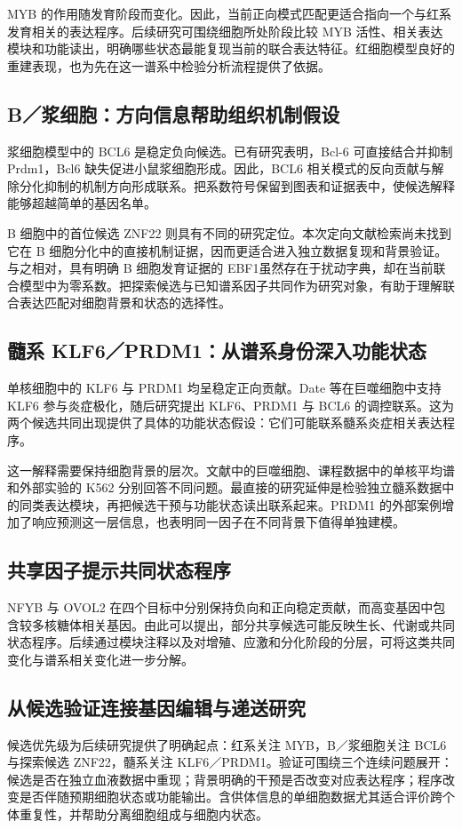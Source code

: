 \documentclass[UTF8,a4paper,11pt,fontset=fandol]{ctexart}
\begin{document}
MYB 的作用随发育阶段而变化。因此，当前正向模式匹配更适合指向一个与红系发育相关的表达程序。后续研究可围绕细胞所处阶段比较 MYB 活性、相关表达模块和功能读出，明确哪些状态最能复现当前的联合表达特征。红细胞模型良好的重建表现，也为先在这一谱系中检验分析流程提供了依据。
\subsection{B／浆细胞：方向信息帮助组织机制假设}
浆细胞模型中的 BCL6 是稳定负向候选。已有研究表明，Bcl-6 可直接结合并抑制 Prdm1，Bcl6 缺失促进小鼠浆细胞形成\cite{R05}。因此，BCL6 相关模式的反向贡献与解除分化抑制的机制方向形成联系。把系数符号保留到图表和证据表中，使候选解释能够超越简单的基因名单。

B 细胞中的首位候选 ZNF22 则具有不同的研究定位。本次定向文献检索尚未找到它在 B 细胞分化中的直接机制证据，因而更适合进入独立数据复现和背景验证。与之相对，具有明确 B 细胞发育证据的 EBF1\cite{R08}虽然存在于扰动字典，却在当前联合模型中为零系数。把探索候选与已知谱系因子共同作为研究对象，有助于理解联合表达匹配对细胞背景和状态的选择性。
\subsection{髓系 KLF6／PRDM1：从谱系身份深入功能状态}
单核细胞中的 KLF6 与 PRDM1 均呈稳定正向贡献。Date 等在巨噬细胞中支持 KLF6 参与炎症极化\cite{R06}，随后研究提出 KLF6、PRDM1 与 BCL6 的调控联系\cite{R07}。这为两个候选共同出现提供了具体的功能状态假设：它们可能联系髓系炎症相关表达程序。

这一解释需要保持细胞背景的层次。文献中的巨噬细胞、课程数据中的单核平均谱和外部实验的 K562 分别回答不同问题。最直接的研究延伸是检验独立髓系数据中的同类表达模块，再把候选干预与功能状态读出联系起来。PRDM1 的外部案例增加了响应预测这一层信息，也表明同一因子在不同背景下值得单独建模。
\subsection{共享因子提示共同状态程序}
NFYB 与 OVOL2 在四个目标中分别保持负向和正向稳定贡献，而高变基因中包含较多核糖体相关基因。由此可以提出，部分共享候选可能反映生长、代谢或共同状态程序。后续通过模块注释以及对增殖、应激和分化阶段的分层，可将这类共同变化与谱系相关变化进一步分解。

\clearpage
\subsection{从候选验证连接基因编辑与递送研究}
候选优先级为后续研究提供了明确起点：红系关注 MYB，B／浆细胞关注 BCL6 与探索候选 ZNF22，髓系关注 KLF6／PRDM1。验证可围绕三个连续问题展开：候选是否在独立血液数据中重现；背景明确的干预是否改变对应表达程序；程序改变是否伴随预期细胞状态或功能输出。含供体信息的单细胞数据尤其适合评价跨个体重复性，并帮助分离细胞组成与细胞内状态。
\end{document}
